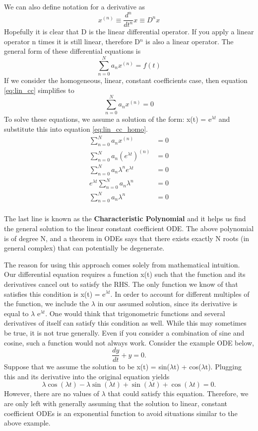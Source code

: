 \documentclass{article}
\newcommand{\be}{\begin{equation}}
\newcommand{\ee}{\end{equation}}
\begin{document}
We can also define notation for a derivative as
\be
x^(n) \equiv \frac{d^n}{dt^n}x \equiv D^n x
\ee
Hopefully it is clear that D is the linear differential operator.
If you apply a linear operator n times it is still linear, therefore D$^n$ is also a linear operator.
The general form of these differential equations is
\be \label{eq:lin_cc}
\sum_{n=0}^N a_nx^{(n)} = f(t)
\ee
If we consider the homogeneous, linear, constant coefficients case, then equation \ref{eq:lin_cc} simplifies to
\be \label{eq:lin_cc_homo}
\sum_{n=0}^N a_nx^{(n)} = 0
\ee
To solve these equations, we assume a solution of the form: x(t) = e$^{\lambda t}$ and substitute this into equation \ref{eq:lin_cc_homo}.
\be
\begin{split}
    \sum_{n=0}^N a_nx^{(n)} &= 0\\
    \sum_{n=0}^N a_n \left(e^{\lambda t}\right) ^{(n)} &= 0\\
    \sum_{n=0}^N a_n \lambda^n e^{\lambda t} &= 0\\
    e^{\lambda t} \sum_{n=0}^N a_n \lambda^n &= 0\\
    \sum_{n=0}^N a_n \lambda^n &= 0\\
\end{split}
\ee

The last line is known as the \textbf{Characteristic Polynomial} and it helps us find the general solution to the linear constant coefficient ODE.
The above polynomial is of degree N, and a theorem in  ODEs says that there exists exactly N roots (in general complex) that can potentially be degenerate.

The reason for using this approach comes solely from mathematical intuition.
Our differential equation requires a function x(t) such that the function and its derivatives cancel out to satisfy the RHS.
The only function we know of that satisfies this condition is x(t) = e$^{\lambda t}$.
In order to account for different multiples of the function, we include the $\lambda$ in our assumed solution, since its derivative is equal to $\lambda$ e$^{\lambda t}$.
One would think that trigonometric functions and several derivatives of itself can satisfy this condition as well.
While this may sometimes be true, it is not true generally.
Even if you consider a combination of sine and cosine, such a function would not always work.
Consider the example ODE below,
\be
\frac{dy}{dt} + y = 0 .
\ee
Suppose that we assume the solution to be x(t) = sin($\lambda$t) + cos($\lambda$t).
Plugging this and its derivative into the original equation yields
\be
\lambda \cos(\lambda t) - \lambda \sin(\lambda t) + \sin(\lambda t) + \cos(\lambda t) = 0 .
\ee
However, there are no values of $\lambda$ that could satisfy this equation.
Therefore, we are only left with generally assuming that the solution to linear, constant coefficient ODEs is an exponential function to avoid situations similar to the above example.
\end{document}

